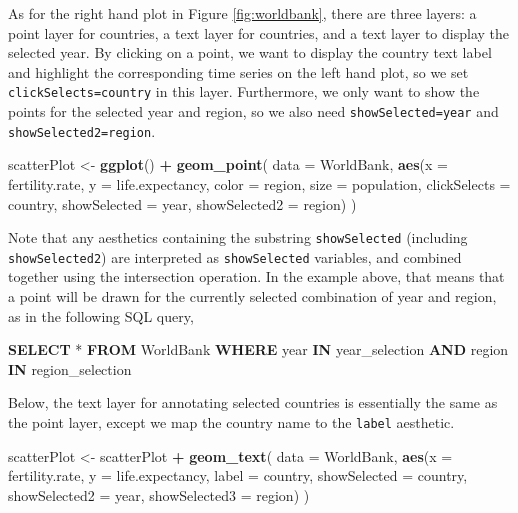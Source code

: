 \documentclass[12pt,]{article}
\newenvironment{Shaded}{\begin{snugshade}}{\end{snugshade}}
\newcommand{\DataTypeTok}[1]{\textcolor[rgb]{0.13,0.29,0.53}{#1}}
\newcommand{\KeywordTok}[1]{\textcolor[rgb]{0.13,0.29,0.53}{\textbf{#1}}}
\newcommand{\NormalTok}[1]{#1}
\newcommand{\OperatorTok}[1]{\textcolor[rgb]{0.81,0.36,0.00}{\textbf{#1}}}
\newcommand{\StringTok}[1]{\textcolor[rgb]{0.31,0.60,0.02}{#1}}
\theoremstyle{definition}
\theoremstyle{definition}
\theoremstyle{definition}
\theoremstyle{remark}
\begin{document}
As for the right hand plot in Figure \ref{fig:worldbank}, there are
three layers: a point layer for countries, a text layer for countries,
and a text layer to display the selected year. By clicking on a point,
we want to display the country text label and highlight the
corresponding time series on the left hand plot, so we set
\texttt{clickSelects=country} in this layer. Furthermore, we only want
to show the points for the selected year and region, so we also need
\texttt{showSelected=year} and \texttt{showSelected2=region}.

\begin{Shaded}
\begin{Highlighting}[]
\NormalTok{scatterPlot <-}\StringTok{ }\KeywordTok{ggplot}\NormalTok{() }\OperatorTok{+}\StringTok{ }\KeywordTok{geom_point}\NormalTok{(}
  \DataTypeTok{data =}\NormalTok{ WorldBank,}
  \KeywordTok{aes}\NormalTok{(}\DataTypeTok{x =}\NormalTok{ fertility.rate, }\DataTypeTok{y =}\NormalTok{ life.expectancy,}
      \DataTypeTok{color =}\NormalTok{ region, }\DataTypeTok{size =}\NormalTok{ population,}
      \DataTypeTok{clickSelects =}\NormalTok{ country,}
      \DataTypeTok{showSelected =}\NormalTok{ year,}
      \DataTypeTok{showSelected2 =}\NormalTok{ region)}
\NormalTok{)}
\end{Highlighting}
\end{Shaded}

Note that any aesthetics containing the substring \texttt{showSelected}
(including \texttt{showSelected2}) are interpreted as
\texttt{showSelected} variables, and combined together using the
intersection operation. In the example above, that means that a point
will be drawn for the currently selected combination of year and region,
as in the following SQL query,

\begin{Shaded}
\begin{Highlighting}[]
\KeywordTok{SELECT}\NormalTok{ * }\KeywordTok{FROM}\NormalTok{ WorldBank}
  \KeywordTok{WHERE} \DataTypeTok{year}   \KeywordTok{IN}\NormalTok{ year_selection}
  \KeywordTok{AND}\NormalTok{   region }\KeywordTok{IN}\NormalTok{ region_selection}
\end{Highlighting}
\end{Shaded}

Below, the text layer for annotating selected countries is essentially
the same as the point layer, except we map the country name to the
\texttt{label} aesthetic.

\begin{Shaded}
\begin{Highlighting}[]
\NormalTok{scatterPlot <-}\StringTok{ }\NormalTok{scatterPlot }\OperatorTok{+}\StringTok{ }\KeywordTok{geom_text}\NormalTok{(}
  \DataTypeTok{data =}\NormalTok{ WorldBank,}
  \KeywordTok{aes}\NormalTok{(}\DataTypeTok{x =}\NormalTok{ fertility.rate, }\DataTypeTok{y =}\NormalTok{ life.expectancy,}
      \DataTypeTok{label =}\NormalTok{ country,}
      \DataTypeTok{showSelected =}\NormalTok{ country,}
      \DataTypeTok{showSelected2 =}\NormalTok{ year,}
      \DataTypeTok{showSelected3 =}\NormalTok{ region)}
\NormalTok{)}
\end{Highlighting}
\end{Shaded}
\end{document}
